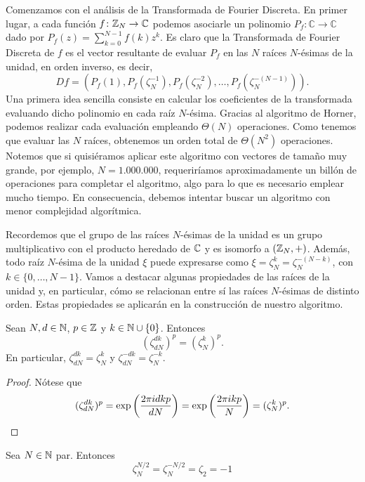 \documentclass{article}
\begin{document}
Comenzamos con el análisis de la Transformada de Fourier Discreta. En primer lugar, a cada función $f \colon \mathbb{Z}_N \to \mathbb{C}$ podemos asociarle un polinomio $P_f\colon \mathbb{C} \to \mathbb{C}$ dado por $P_f(z) = \sum_{k=0}^{N-1}f(k) z^k$. Es claro que la Transformada de Fourier Discreta de $f$ es el vector resultante de evaluar $P_f$ en las $N$ raíces $N$-ésimas de la unidad, en orden inverso, es decir,
\[ Df = \left(P_f(1),P_f(\zeta_N^{-1}), P_f(\zeta_N^{-2}),\dots,P_f(\zeta_N^{-(N-1)})\right). \]
Una primera idea sencilla consiste en calcular los coeficientes de la transformada evaluando dicho polinomio en cada raíz $N$-ésima. Gracias al algoritmo de Horner, podemos realizar cada evaluación empleando $\Theta(N)$ operaciones. Como tenemos que evaluar las $N$ raíces, obtenemos un orden total de $\Theta(N^2)$ operaciones. Notemos que si quisiéramos aplicar este algoritmo con vectores de tamaño muy grande, por ejemplo, $N = 1.000.000$, requeriríamos aproximadamente un billón de operaciones para completar el algoritmo, algo para lo que es necesario emplear mucho tiempo. En consecuencia, debemos intentar buscar un algoritmo con menor complejidad algorítmica.

Recordemos que el grupo de las raíces $N$-ésimas de la unidad es un grupo multiplicativo con el producto heredado de $\mathbb{C}$ y es isomorfo a $(\mathbb{Z}_N,+)$. Además, todo raíz $N$-ésima de la unidad $\xi$ puede expresarse como $\xi = \zeta_N^k = \zeta_N^{-(N-k)}$, con $k \in \{0,\dots,N-1\}$. Vamos a destacar algunas propiedades de las raíces de la unidad y, en particular, cómo se relacionan entre sí las raíces $N$-ésimas de distinto orden. Estas propiedades se aplicarán en la construcción de nuestro algoritmo.

\begin{lem} \label{lem:prop_cancel}
    Sean $N,d \in \mathbb{N}$, $p\in \mathbb{Z}$ y $k \in \mathbb{N}\cup\{0\}$. Entonces
    \[ (\zeta_{dN}^{dk})^p = (\zeta_{N}^{k})^p. \]
    En particular, $\zeta_{dN}^{dk} = \zeta_{N}^{k}$ y $\zeta_{dN}^{-dk} = \zeta_{N}^{-k}$.
\end{lem}
\begin{proof} Nótese que
 \[ (\zeta_{dN}^{dk})^p = \exp\left(\frac{2\pi i dkp}{dN}\right) = \exp\left(\frac{2\pi i kp}{N}\right) = (\zeta_{N}^{k})^{p}. \qedhere \]
\end{proof}

\begin{cor} \label{cor:prop_cancel}
    Sea $N \in \mathbb{N}$ par. Entonces
    \[ \zeta_N^{N/2} = \zeta_N^{-N/2} = \zeta_2 = -1 \]
\end{cor}
\end{document}
